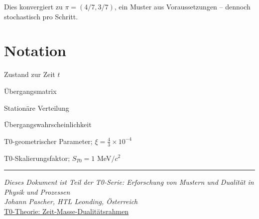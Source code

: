\documentclass[12pt,a4paper]{article}
\begin{document}
	Dies konvergiert zu $\pi = (4/7, 3/7)$, ein Muster aus Voraussetzungen – dennoch stochastisch pro Schritt.
	
	\section{Notation}
	
	\begin{description}[leftmargin=1cm]
		\item[$X_t$] Zustand zur Zeit $t$
		\item[$P$] Übergangsmatrix
		\item[$\pi$] Stationäre Verteilung
		\item[$p_{ij}$] Übergangswahrscheinlichkeit
		\item[$\xi$] T0-geometrischer Parameter; $\xi = \frac{4}{3} \times 10^{-4}$
		\item[$S_{T0}$] T0-Skalierungsfaktor; $S_{T0} = 1$ MeV$/c^2$
	\end{description}
	
	\begin{center}
		\hrule
		\vspace{0.5cm}
		\textit{Dieses Dokument ist Teil der T0-Serie: Erforschung von Mustern und Dualität in Physik und Prozessen}\\
		\textit{Johann Pascher, HTL Leonding, Österreich}\\
		\vspace{0.3cm}
		\href{https://github.com/jpascher/T0-Time-Mass-Duality}{T0-Theorie: Zeit-Masse-Dualitätsrahmen}
		\vspace{0.3cm}
	\end{center}
	
\end{document}
